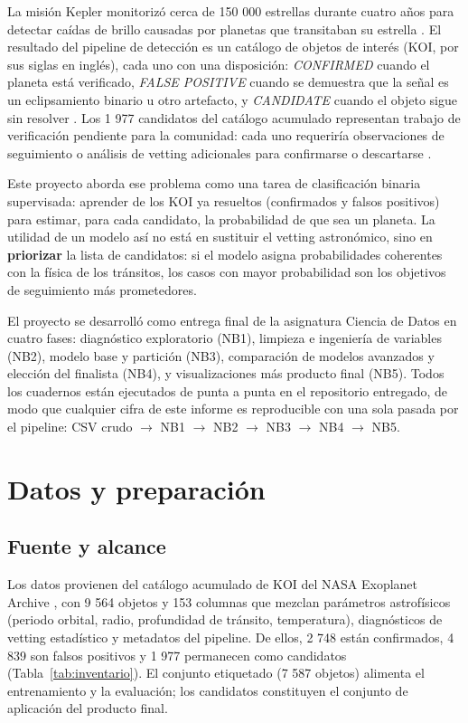 \documentclass[a4paper,12pt]{article}
\begin{document}
  La misión Kepler monitorizó cerca de 150 000 estrellas durante cuatro años para
  detectar caídas de brillo causadas por planetas que transitaban su estrella
  \cite{borucki2010}. El resultado del pipeline de detección es un catálogo de
  objetos de interés (KOI, por sus siglas en inglés), cada uno con una disposición:
  \textit{CONFIRMED} cuando el planeta está verificado, \textit{FALSE POSITIVE}
  cuando se demuestra que la señal es un eclipsamiento binario u otro artefacto, y
  \textit{CANDIDATE} cuando el objeto sigue sin resolver
  \cite{akeson2013}. Los 1 977 candidatos del catálogo acumulado representan
  trabajo de verificación pendiente para la comunidad: cada uno requeriría
  observaciones de seguimiento o análisis de vetting adicionales para confirmarse
  o descartarse \cite{thompson2018}.

  Este proyecto aborda ese problema como una tarea de clasificación binaria
  supervisada: aprender de los KOI ya resueltos (confirmados y falsos positivos)
  para estimar, para cada candidato, la probabilidad de que sea un planeta. La
  utilidad de un modelo así no está en sustituir el vetting astronómico, sino en
  \textbf{priorizar} la lista de candidatos: si el modelo asigna probabilidades
  coherentes con la física de los tránsitos, los casos con mayor probabilidad son
  los objetivos de seguimiento más prometedores.

  El proyecto se desarrolló como entrega final de la asignatura Ciencia de Datos en
  cuatro fases: diagnóstico exploratorio (NB1), limpieza e ingeniería de variables
  (NB2), modelo base y partición (NB3), comparación de modelos avanzados y
  elección del finalista (NB4), y visualizaciones más producto final (NB5). Todos
  los cuadernos están ejecutados de punta a punta en el repositorio entregado, de
  modo que cualquier cifra de este informe es reproducible con una sola pasada por
  el pipeline: CSV crudo $\rightarrow$ NB1 $\rightarrow$ NB2 $\rightarrow$ NB3
  $\rightarrow$ NB4 $\rightarrow$ NB5.

  \section{Datos y preparación}

  \subsection{Fuente y alcance}

  Los datos provienen del catálogo acumulado de KOI del NASA Exoplanet Archive
  \cite{akeson2013}, con 9 564 objetos y 153 columnas que mezclan parámetros
  astrofísicos (periodo orbital, radio, profundidad de tránsito, temperatura),
  diagnósticos de vetting estadístico y metadatos del pipeline. De ellos, 2 748
  están confirmados, 4 839 son falsos positivos y 1 977 permanecen como candidatos
  (Tabla~\ref{tab:inventario}). El conjunto etiquetado (7 587 objetos) alimenta el
  entrenamiento y la evaluación; los candidatos constituyen el conjunto de
  aplicación del producto final.
\end{document}
